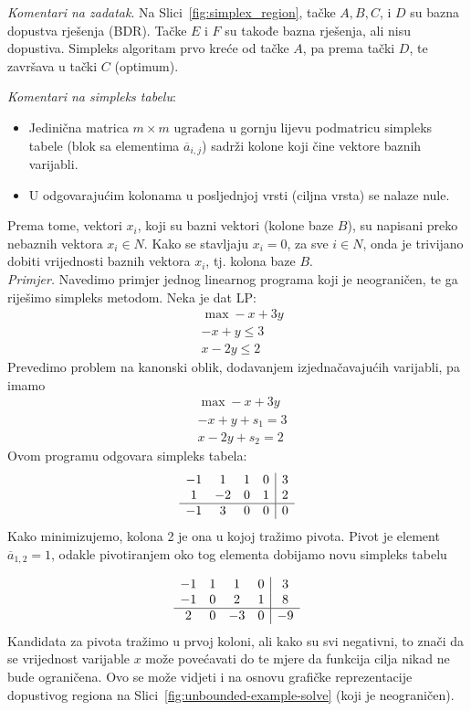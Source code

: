 \documentclass[a4paper, utf8, 11pt, colorlinks]{book}
\begin{document}
 \emph{Komentari na zadatak}. Na Slici~\ref{fig:simplex_region}, tačke $A, B, C$, i $D$ su bazna dopustva rješenja (BDR). Tačke $E$ i $F$ su takođe bazna rješenja, ali nisu dopustiva. Simpleks algoritam prvo kreće od tačke $A$, pa prema tački $D$, te završava u tački $C$ (optimum).
 
 \emph{Komentari na simpleks tabelu}:
 \begin{itemize}
     \item Jedinična matrica $m \times m$   ugrađena u gornju lijevu podmatricu simpleks tabele (blok sa elementima $\overline{a}_{i,j}$) sadrži kolone koji čine vektore baznih varijabli.
     \item U odgovarajućim kolonama u posljednjoj vrsti (ciljna vrsta) se nalaze nule.
 \end{itemize}
 Prema tome, vektori $x_i$, koji su bazni vektori (kolone baze $B$), su napisani preko nebaznih vektora $x_i \in N$. Kako se stavljaju $x_i  = 0$, za sve $i \in N$, onda je trivijano dobiti vrijednosti baznih vektora $x_i$, tj. kolona baze $B$. 
 \vspace{1cm}\\
 \emph{Primjer.} Navedimo primjer jednog linearnog programa koji je neograničen, te ga riješimo simpleks metodom. 
  Neka je dat LP:
  \begin{align*}
  	  &\max -x + 3y \\
  	  & -x + y \leq 3 \\
  	  & x - 2y \leq 2 
  \end{align*}
 Prevedimo problem na kanonski oblik, dodavanjem izjednačavajućih varijabli, pa imamo 
 \begin{align*}
      &\max -x + 3y \\
     & -x + y + s_1 = 3 \\
     & x - 2y + s_2 = 2  
 \end{align*}
Ovom programu odgovara simpleks tabela:
$$\begin{array}{cccc| c} 
	   -1 & 1  & 1 & 0 & 3 \\
	    1 & -2 & 0 & 1 & 2 \\ \hline
	   -1 & 3  & 0 & 0 & 0  
\end{array}$$
Kako minimizujemo,  kolona 2 je ona u kojoj tražimo pivota. Pivot je element 
$\overline{a}_{1, 2} = 1$, odakle pivotiranjem oko tog elementa dobijamo novu simpleks tabelu 

$$\begin{array}{cccc| c} 
		   -1 & 1  & 1  &  0 & 3 \\
		   -1 & 0  & 2  &  1 & 8 \\ \hline
		   2  & 0  & -3 &  0 & -9 \\
\end{array}$$
Kandidata za pivota tražimo u prvoj koloni, ali kako su svi negativni, to znači da se 
vrijednost  varijable $x$  može povećavati do te mjere da funkcija cilja nikad ne bude ograničena. 
Ovo se može vidjeti i na osnovu grafičke reprezentacije dopustivog regiona na Slici~\ref{fig:unbounded-example-solve} (koji je neograničen). 
\end{document}
